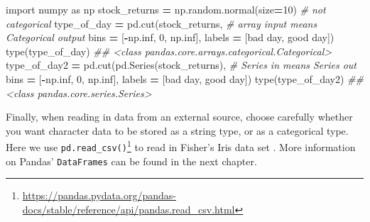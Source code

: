 \documentclass[
  12pt,
  krantz2]{krantz}
\makeatletter
\newenvironment{Shaded}{\begin{snugshade}}{\end{snugshade}}
\newcommand{\BuiltInTok}[1]{#1}
\newcommand{\CommentTok}[1]{\textcolor[rgb]{0.37,0.37,0.37}{\textit{#1}}}
\newcommand{\DecValTok}[1]{\textcolor[rgb]{0.06,0.06,0.06}{#1}}
\newcommand{\ImportTok}[1]{#1}
\newcommand{\NormalTok}[1]{#1}
\newcommand{\OperatorTok}[1]{\textcolor[rgb]{0.43,0.43,0.43}{\textbf{#1}}}
\newcommand{\StringTok}[1]{\textcolor[rgb]{0.5,0.5,0.5}{#1}}
\renewcommand{\href}[2]{#2\footnote{\url{#1}}}
\newenvironment{kframe}{%
\medskip{}
\setlength{\fboxsep}{.8em}
 \def\at@end@of@kframe{}%
 \ifinner\ifhmode%
  \def\at@end@of@kframe{\end{minipage}}%
  \begin{minipage}{\columnwidth}%
 \fi\fi%
 \def\FrameCommand##1{\hskip\@totalleftmargin \hskip-\fboxsep
 \colorbox{shadecolor}{##1}\hskip-\fboxsep
     \hskip-\linewidth \hskip-\@totalleftmargin \hskip\columnwidth}%
 \MakeFramed {\advance\hsize-\width
   \@totalleftmargin\z@ \linewidth\hsize
   \@setminipage}}%
 {\par\unskip\endMakeFramed%
 \at@end@of@kframe}
\renewenvironment{Shaded}{\begin{kframe}}{\end{kframe}}
\makeatother
\begin{document}
\begin{Shaded}
\begin{Highlighting}[]
\ImportTok{import}\NormalTok{ numpy }\ImportTok{as}\NormalTok{ np}
\NormalTok{stock\_returns }\OperatorTok{=}\NormalTok{ np.random.normal(size}\OperatorTok{=}\DecValTok{10}\NormalTok{) }\CommentTok{\# not categorical }
\NormalTok{type\_of\_day }\OperatorTok{=}\NormalTok{ pd.cut(stock\_returns, }\CommentTok{\# array input means Categorical output}
\NormalTok{                     bins }\OperatorTok{=}\NormalTok{ [}\OperatorTok{{-}}\NormalTok{np.inf, }\DecValTok{0}\NormalTok{, np.inf], }
\NormalTok{                     labels }\OperatorTok{=}\NormalTok{ [}\StringTok{\textquotesingle{}bad day\textquotesingle{}}\NormalTok{, }\StringTok{\textquotesingle{}good day\textquotesingle{}}\NormalTok{]) }
\BuiltInTok{type}\NormalTok{(type\_of\_day)}
\CommentTok{\#\# \textless{}class \textquotesingle{}pandas.core.arrays.categorical.Categorical\textquotesingle{}\textgreater{}}
\NormalTok{type\_of\_day2 }\OperatorTok{=}\NormalTok{ pd.cut(pd.Series(stock\_returns), }\CommentTok{\# Series in means Series out}
\NormalTok{                      bins }\OperatorTok{=}\NormalTok{ [}\OperatorTok{{-}}\NormalTok{np.inf, }\DecValTok{0}\NormalTok{, np.inf], }
\NormalTok{                      labels }\OperatorTok{=}\NormalTok{ [}\StringTok{\textquotesingle{}bad day\textquotesingle{}}\NormalTok{, }\StringTok{\textquotesingle{}good day\textquotesingle{}}\NormalTok{]) }
\BuiltInTok{type}\NormalTok{(type\_of\_day2)}
\CommentTok{\#\# \textless{}class \textquotesingle{}pandas.core.series.Series\textquotesingle{}\textgreater{}}
\end{Highlighting}
\end{Shaded}

Finally, when reading in data from an external source, choose carefully whether you want character data to be stored as a string type, or as a categorical type. Here we use \href{https://pandas.pydata.org/pandas-docs/stable/reference/api/pandas.read_csv.html}{\texttt{pd.read\_csv()}} to read in Fisher's Iris data set \citep{misc_iris_53}. More information on Pandas' \texttt{DataFrames} can be found in the next chapter.
\end{document}
